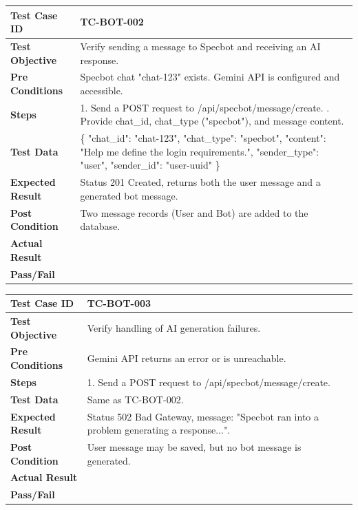 \begin{longtable}{|p{}|p{}|}
\hline
\textbf{Test Case ID} & TC-BOT-002 \\ \hline
\textbf{Test Objective} & Verify sending a message to Specbot and receiving an AI response. \\ \hline
\textbf{Pre Conditions} & Specbot chat "chat-123" exists. Gemini API is configured and accessible. \\ \hline
\textbf{Steps} & 
1. Send a POST request to /api/specbot/message/create. \newline
2. Provide chat\_id, chat\_type ("specbot"), and message content. \\ \hline
\textbf{Test Data} & \{ "chat_id": "chat-123", "chat_type": "specbot", "content": "Help me define the login requirements.", "sender_type": "user", "sender_id": "user-uuid" \} \\ \hline
\textbf{Expected Result} & Status 201 Created, returns both the user message and a generated bot message. \\ \hline
\textbf{Post Condition} & Two message records (User and Bot) are added to the database. \\ \hline
\textbf{Actual Result} &  \\ \hline
\textbf{Pass/Fail} &  \\ \hline
\end{longtable}

\begin{longtable}{|p{}|p{}|}
\hline
\textbf{Test Case ID} & TC-BOT-003 \\ \hline
\textbf{Test Objective} & Verify handling of AI generation failures. \\ \hline
\textbf{Pre Conditions} & Gemini API returns an error or is unreachable. \\ \hline
\textbf{Steps} & 
1. Send a POST request to /api/specbot/message/create. \\ \hline
\textbf{Test Data} & Same as TC-BOT-002. \\ \hline
\textbf{Expected Result} & Status 502 Bad Gateway, message: "Specbot ran into a problem generating a response...". \\ \hline
\textbf{Post Condition} & User message may be saved, but no bot message is generated. \\ \hline
\textbf{Actual Result} &  \\ \hline
\textbf{Pass/Fail} &  \\ \hline
\end{longtable}

